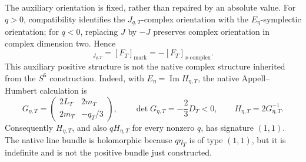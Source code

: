The auxiliary orientation is fixed, rather than repaired by an absolute value.
For \(q>0\), compatibility identifies the \(J_{q,T}\)-complex orientation
with the \(E_\eta\)-symplectic orientation; for \(q<0\), replacing \(J\) by
\(-J\) preserves complex orientation in complex dimension two.  Hence
\begin{equation}
 [F_T]_{J_{q,T}}=[F_T]_{\mathrm{mark}}
 =-[F_T]_{x\text{-}\mathrm{complex}}.
 \label{cusp-native-full-flux-auxiliary-native-orientations}
\end{equation}
This auxiliary positive structure is not the native complex structure inherited
from the \(S^6\) construction.  Indeed, with \(E_\eta=\operatorname{Im}H_{\eta,T}\),
the native Appell--Humbert calculation is
\begin{equation}
 G_{\eta,T}=
 \begin{pmatrix}
  2L_T&2m_T\\
  2m_T&-q_T/3
 \end{pmatrix},
 \qquad
 \det G_{\eta,T}=-\frac23D_T<0,
 \qquad H_{\eta,T}=2G_{\eta,T}^{-1}.
 \label{cusp-native-full-flux-native-hermitian-signature}
\end{equation}
Consequently \(H_{\eta,T}\), and also \(qH_{\eta,T}\) for every nonzero
\(q\), has signature \((1,1)\).  The native line bundle is holomorphic because
\(q\eta_T\) is of type \((1,1)\), but it is indefinite and is not the positive
bundle just constructed.

